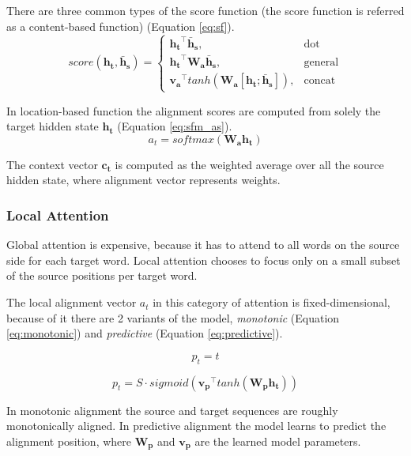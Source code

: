 There are three common types of the score function (the score function is referred as a content-based function) (Equation \ref{eq:sf}).
\begin{equation}\label{eq:sf}
score(\mathbf{h_t}, \mathbf{\bar{h}_s}) = \begin{cases} \mathbf{h_t}^\intercal \mathbf{\bar{h}_s}, & \mbox{dot} \\ \mathbf{h_t}^\intercal \mathbf{W_a} \mathbf{\bar{h}_s}, & \mbox{general} \\ \mathbf{v_a}^\intercal tanh(\mathbf{W_a} [\mathbf{h_t}; \mathbf{\bar{h}_s}]), & \mbox{concat} \end{cases}
\end{equation}

In location-based function the alignment scores are computed from solely the target hidden state $\mathbf{h_t}$ (Equation \ref{eq:sfm_as}).
\begin{equation} \label{eq:sfm_as}
a_t = softmax(\mathbf{W_a}\mathbf{h_t})
\end{equation}

The context vector $\mathbf{c_t}$ is computed as the weighted average over all the source hidden state, where alignment vector represents weights.

\subsubsection{Local Attention}
Global attention is expensive, because it has to attend to all words on the source side for each target word. Local attention chooses to focus only on a small subset of the source positions per target word.

The local alignment vector $a_t$ in this category of attention is fixed-dimensional, because of it there are 2 variants of the model, \textit{monotonic} (Equation \ref{eq:monotonic}) and \textit{predictive} (Equation \ref{eq:predictive}).

\begin{equation} \label{eq:monotonic}
p_t = t
\end{equation}

\begin{equation} \label{eq:predictive}
p_t = S \cdot sigmoid(\mathbf{v_p}^\intercal tanh(\mathbf{W_p} \mathbf{h_t}))
\end{equation}

In monotonic alignment the source and target sequences are roughly monotonically aligned. In predictive alignment the model learns to predict the alignment position, where $\mathbf{W_p}$ and $\mathbf{v_p}$ are the learned model parameters.

